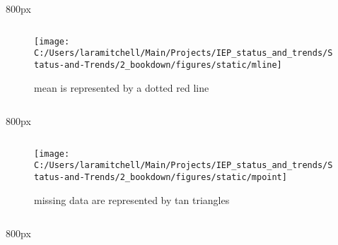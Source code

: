 \documentclass[
]{book}
\begin{document}
\begin{columns-nocenter}

\begin{column}{800px\textwidth}
\begin{column}

\begin{figure}
\texttt{[image: C:/Users/laramitchell/Main/Projects/IEP\_status\_and\_trends/Status-and-Trends/2\_bookdown/figures/static/mline]} \caption{mean is represented by a dotted red line}\label{fig:unnamed-chunk-83}
\end{figure}

\end{column}
\end{column}

\begin{column}{800px\textwidth}
\begin{column}

\begin{figure}
\texttt{[image: C:/Users/laramitchell/Main/Projects/IEP\_status\_and\_trends/Status-and-Trends/2\_bookdown/figures/static/mpoint]} \caption{missing data are represented by tan triangles}\label{fig:unnamed-chunk-84}
\end{figure}

\end{column}
\end{column}

\begin{column}{800px\textwidth}
\begin{column}

\end{column}
\end{column}

\end{columns-nocenter}
\end{document}
